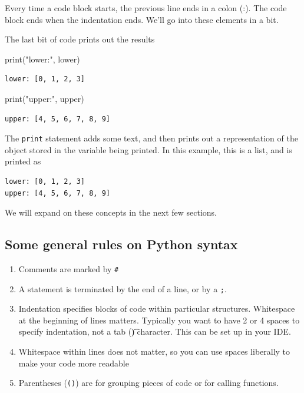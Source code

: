 \documentclass[
  letterpaper,
]{scrbook}
\newenvironment{Shaded}{\begin{snugshade}}{\end{snugshade}}
\newcommand{\BuiltInTok}[1]{#1}
\newcommand{\NormalTok}[1]{#1}
\newcommand{\StringTok}[1]{\textcolor[rgb]{0.31,0.60,0.02}{#1}}
\providecommand{\tightlist}{%
  \setlength{\itemsep}{0pt}\setlength{\parskip}{0pt}}
\begin{document}
Every time a code block starts, the previous line ends in a colon (:). The code block ends when the indentation ends. We'll go into these elements in a bit.

The last bit of code prints out the results

\begin{Shaded}
\begin{Highlighting}[]
\BuiltInTok{print}\NormalTok{(}\StringTok{"lower:"}\NormalTok{, lower)}
\end{Highlighting}
\end{Shaded}

\begin{verbatim}
lower: [0, 1, 2, 3]
\end{verbatim}

\begin{Shaded}
\begin{Highlighting}[]
\BuiltInTok{print}\NormalTok{(}\StringTok{"upper:"}\NormalTok{, upper)}
\end{Highlighting}
\end{Shaded}

\begin{verbatim}
upper: [4, 5, 6, 7, 8, 9]
\end{verbatim}

The \texttt{print} statement adds some text, and then prints out a representation of the object stored in the variable being printed. In this example, this is a list, and is printed as

\begin{verbatim}
lower: [0, 1, 2, 3]
upper: [4, 5, 6, 7, 8, 9]
\end{verbatim}

We will expand on these concepts in the next few sections.

\hypertarget{some-general-rules-on-python-syntax}{%
\subsection{Some general rules on Python syntax}\label{some-general-rules-on-python-syntax}}

\begin{enumerate}
\def\labelenumi{\arabic{enumi}.}
\tightlist
\item
  Comments are marked by \texttt{\#}
\item
  A statement is terminated by the end of a line, or by a \texttt{;}.
\item
  Indentation specifies blocks of code within particular structures. Whitespace at the beginning of lines matters. Typically you want to have 2 or 4 spaces to specify indentation, not a tab (\t) character. This can be set up in your IDE.
\item
  Whitespace within lines does not matter, so you can use spaces liberally to make your code more readable
\item
  Parentheses (\texttt{()}) are for grouping pieces of code or for calling functions.
\end{enumerate}
\end{document}
